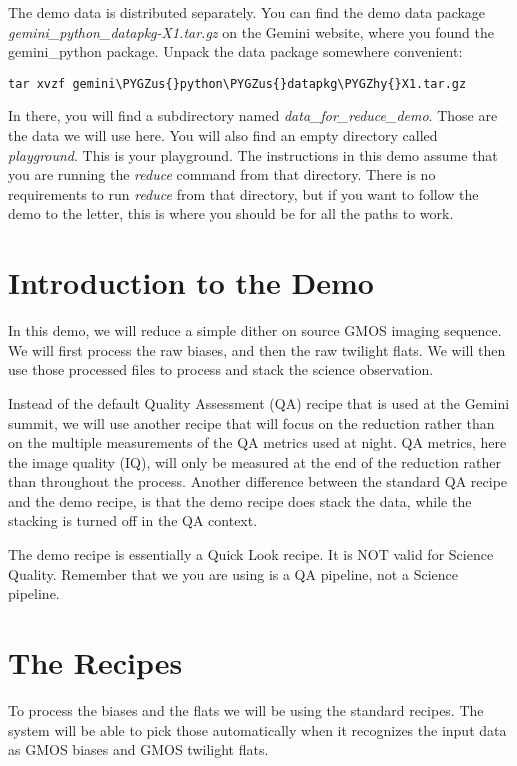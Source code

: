 \documentclass[letterpaper,10pt,english]{sphinxmanual}
\def\PYGZus{\char`\_}
\def\PYGZhy{\char`\-}
\begin{document}
The demo data is distributed separately.  You can find the demo data package
\emph{gemini\_python\_datapkg-X1.tar.gz} on the Gemini website, where you found the
gemini\_python package.  Unpack the data package somewhere convenient:

\begin{Verbatim}[commandchars=\\\{\}]
tar xvzf gemini\PYGZus{}python\PYGZus{}datapkg\PYGZhy{}X1.tar.gz
\end{Verbatim}

In there, you will find a subdirectory named \emph{data\_for\_reduce\_demo}.  Those are
the data we will use here.  You will also find an empty directory called
\emph{playground}.  This is your playground. The instructions in this demo assume that
you are running the \emph{reduce} command from that directory.  There is no requirements
to run \emph{reduce} from that directory, but if you want to follow the demo to the
letter, this is where you should be for all the paths to work.


\section{Introduction to the Demo}
\label{appendices/appendix_demo:introduction-to-the-demo}
In this demo, we will reduce a simple dither on source GMOS imaging sequence.
We will first process the raw biases, and then the raw twilight flats.  We will
then use those processed files to process and stack the science observation.

Instead of the default Quality Assessment (QA) recipe that is used at the Gemini
summit, we will use another recipe that will focus on the reduction rather
than on the multiple measurements of the QA metrics used at night.  QA metrics,
here the image quality (IQ), will only be measured at the end of the reduction
rather than throughout the process.   Another difference between the standard
QA recipe and the demo recipe, is that the demo recipe does stack the data, while
the stacking is turned off in the QA context.

The demo recipe is essentially a Quick Look recipe.  It is NOT valid for Science
Quality.  Remember that we you are using is a QA pipeline, not a Science pipeline.


\section{The Recipes}
\label{appendices/appendix_demo:the-recipes}
To process the biases and the flats we will be using the standard recipes. The
system will be able to pick those automatically when it recognizes the input data
as GMOS biases and GMOS twilight flats.
\end{document}
